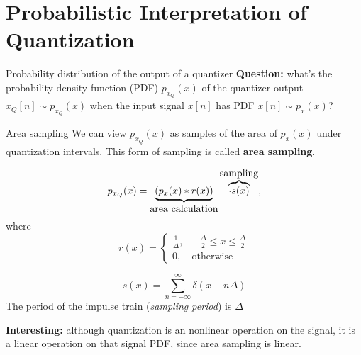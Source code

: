 \documentclass[10pt]{beamer}
\begin{document}
%
\section{Probabilistic Interpretation of Quantization}
\begin{frame}{Probability distribution of the output of a quantizer}
\textbf{Question:} what's the probability density function (PDF) $p_{x_Q}(x)$ of the quantizer output $x_Q[n] \sim p_{x_Q}(x)$ when the input signal $x[n]$ has PDF $x[n] \sim p_{x}(x)$?
\begin{center}
	\resizebox{0.75\textwidth}{!}{}
\end{center}

\end{frame}

%
\begin{frame}{Area sampling}
We can view $p_{x_Q}(x)$ as samples of the area of $p_x(x)$ under quantization intervals. This form of sampling is called \textbf{area sampling}.

\begin{equation*}
p_{x_Q}(x) = \underbrace{(p_x(x) \ast r(x))}_{\text{\normalsize area calculation}}\overbrace{\cdot s(x)}^{\text{\normalsize sampling}},
\end{equation*}
where 
\begin{equation*}
r(x) = \begin{cases}
\frac{1}{\Delta}, & -\frac{\Delta}{2} \leq x \leq \frac{\Delta}{2} \\
0, & \text{otherwise}
\end{cases} \tag{rectangular window of area 1}
\end{equation*}

\begin{equation*}
s(x) = \sum_{n = -\infty}^{\infty} \delta(x - n\Delta) \tag{impulse train}
\end{equation*}
The period of the impulse train (\textit{sampling period}) is $\Delta$

\textbf{Interesting:} although quantization is an nonlinear operation on the signal, it is a linear operation on that signal PDF, since area sampling is linear.
\end{frame}
\end{document}
